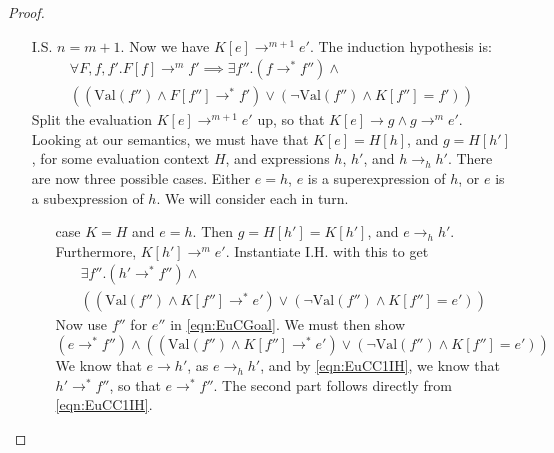 \documentclass[a4paper, 11pt]{report}
\theoremstyle{definition}
\newcommand{\expr}{e}
\newcommand{\elctx}{K}
\newcommand{\step}{\rightarrow}
\newcommand{\stepS}{\rightarrow^*}
\newcommand{\hstep}{\rightarrow_h}
\newcommand{\Val}[1]{\mathrm{Val}(#1)}
\begin{document}
\begin{proof}
\begin{itemize}
    \item[I.S.] $n = m + 1$. Now we have $\elctx[\expr] \step^{m + 1} \expr'$. The induction hypothesis is:
    \begin{multline}\label{eqn:EuCIH}
      \forall F, f, f'. F[f] \step^m f' \implies \exists f'' . (f \stepS f'') \land \\
      \left( (\Val{f''} \land F[f''] \stepS f') \lor
      (\neg \Val{f''} \land \elctx[f''] = f') \right)
    \end{multline}
    Split the evaluation $\elctx[\expr] \step^{m + 1} \expr'$ up, so that 
    $\elctx[\expr] \step g \land g \step^{m} \expr'$. Looking at our semantics, we must have that $\elctx[\expr] = H[h]$, and $g = H[h']$, for some evaluation context $H$, and expressions $h$, $h'$, and $h \hstep h'$.
    There are now three possible cases. Either $\expr = h$, $\expr$ is a superexpression of $h$, or $\expr$ is a subexpression of $h$. We will consider each in turn.
    \begin{itemize}
      \item[case] $\elctx = H$ and $\expr = h$. 
        Then $g = H[h'] = \elctx[h']$, and $\expr \hstep h'$. Furthermore, $\elctx[h'] \step^m \expr'$. Instantiate I.H. with this to get
        \begin{multline}\label{eqn:EuCC1IH}
          \exists f'' . (h' \stepS f'') \land\\
          \left((\Val{f''} \land \elctx[f''] \stepS \expr') \lor
          (\neg \Val{f''} \land \elctx[f''] = \expr') \right)
        \end{multline}
        Now use $f''$ for $\expr''$ in \ref{eqn:EuCGoal}. We must then show
        \begin{equation*}
          (\expr \stepS f'') \land 
          \left( (\Val{f''} \land \elctx[f''] \stepS \expr') \lor
          (\neg \Val{f''} \land \elctx[f''] = \expr') \right)
        \end{equation*}
        We know that $\expr \step h'$, as $\expr \hstep h'$, and by 
        \ref{eqn:EuCC1IH}, we know that $h' \stepS f''$, so that $\expr \stepS f''$. The second part follows directly from \ref{eqn:EuCC1IH}.
      

\end{itemize}
\end{itemize}
\end{proof}
\end{document}
